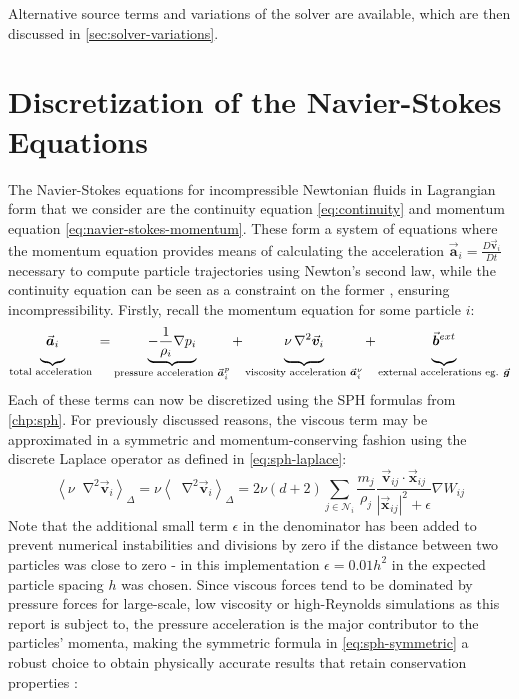 \documentclass[oneside, a4paper]{book}
\newcommand\abs[1]{\left|#1\right|}
\newcommand\angled[1]{\left\langle#1\right\rangle}
\newcommand*\Laplace{\mathop{}\!\mathbin\nabla^2}
\newcommand\vek[1]{\vec{\bm{#1}}}
\begin{document}
  Alternative source terms and variations of the solver are available, which are then discussed in \autoref{sec:solver-variations}.
    \section{Discretization of the Navier-Stokes Equations}\label{sec:sph-navier-stokes}
    The Navier-Stokes equations for incompressible Newtonian fluids in Lagrangian form that we consider are the continuity equation \autoref{eq:continuity} and momentum equation \autoref{eq:navier-stokes-momentum}. These form a system of equations where the momentum equation provides means of calculating the acceleration $\vek{a}_i = \frac{D\vek{v}_i}{Dt}$ necessary to compute particle trajectories using Newton's second law, while the continuity equation can be seen as a constraint on the former \autocite{tutorial2019}, ensuring incompressibility. Firstly, recall the momentum equation for some particle $i$:
    \begin{equation}\label{eq:navier-stokes-annotated}
      \underbrace{\vek{a}_i  \vphantom{\frac{1}{\rho_i}\nabla}}
        _{\text{total acceleration }}=
      \underbrace{-\frac{1}{\rho_i}\nabla p_i}
        _{\text{pressure acceleration }\vek{a}_i^p} + 
      \underbrace{\nu\Laplace\vek{v}_i  \vphantom{\frac{1}{\rho_i}\nabla}}
        _{\text{viscosity acceleration }\vek{a}_i^\nu}+
      \underbrace{\vek{b}^{ext} \vphantom{\frac{1}{\rho_i}\nabla}}
        _{\text{external accelerations eg. }\vek{g}}
    \end{equation}
    Each of these terms can now be discretized using the SPH formulas from \autoref{chp:sph}. For previously discussed reasons, the viscous term may be approximated in a symmetric and momentum-conserving fashion using the discrete Laplace operator as defined in \autoref{eq:sph-laplace}:
    \begin{equation}\label{eq:discrete-viscous}
      \angled{\nu\Laplace\vek{v}_i}_\Delta = \nu\angled{\Laplace\vek{v}_i}_\Delta = 2\nu(d+2)\sum_{j\in\mathcal{N}_i}\frac{m_j}{\rho_j} \frac{\vek{v}_{ij}\cdot\vek{x}_{ij}}{\abs{\vek{x}_{ij}}^2+\epsilon}\nabla W_{ij}
    \end{equation}
    Note that the additional small term $\epsilon$ in the denominator has been added to prevent numerical instabilities and divisions by zero if the distance between two particles was close to zero - in this implementation $\epsilon=0.01h^2$ in the expected particle spacing $h$ was chosen.
    Since viscous forces tend to be dominated by pressure forces for large-scale, low viscosity or high-Reynolds simulations as this report is subject to, the pressure acceleration is the major contributor to the particles' momenta, making the symmetric formula in \autoref{eq:sph-symmetric} a robust choice to obtain physically accurate results that retain conservation properties \autocite{tutorial2019}:
\end{document}
